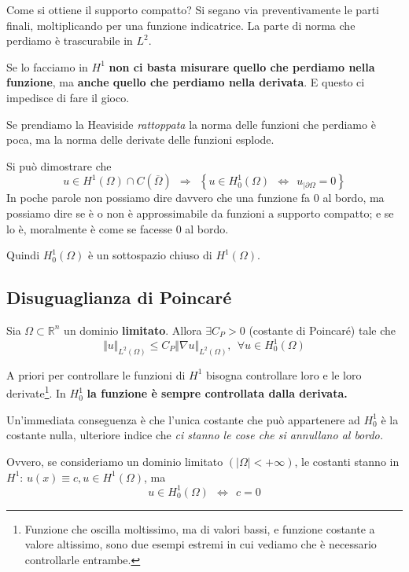 Come si ottiene il supporto compatto? Si segano via preventivamente le parti finali, moltiplicando per una funzione indicatrice. La parte di norma che perdiamo è trascurabile in $L^{2}$.

Se lo facciamo in $H^{1}$ \textbf{non ci basta misurare quello che perdiamo nella funzione}, ma \textbf{anche quello che perdiamo nella derivata}. E questo ci impedisce di fare il gioco.

Se prendiamo la Heaviside \textit{rattoppata} la norma delle funzioni che perdiamo è poca, ma la norma delle derivate delle funzioni esplode.

Si può dimostrare che
\begin{equation*}
    u\in H^{1}(\Omega) \cap C(\overline{\Omega }) \ \ \Rightarrow \ \ \left\{u\in H^{1}_{0}(\Omega) \ \ \Leftrightarrow \ \ u_{|\partial \Omega } =0\right\}
\end{equation*}
In poche parole non possiamo dire davvero che una funzione fa $0$ al bordo, ma possiamo dire se è o non è approssimabile da funzioni a supporto compatto; e se lo è, moralmente è come se facesse $0$ al bordo.

Quindi $H^{1}_{0}(\Omega)$ è un sottospazio chiuso di $H^{1}(\Omega)$.

\subsection{Disuguaglianza di Poincaré}
\begin{theorem}
     Sia $\Omega \subset \mathbb{R}^{n}$ un dominio \textbf{limitato}. Allora $\exists C_{P}  >0$ (costante di Poincaré) tale che
    \begin{equation}
        \Vert u\Vert _{L^{2}(\Omega)} \leqslant C_{P}\Vert \nabla u\Vert _{L^{2}(\Omega)} ,\ \ \forall u\in H^{1}_{0}(\Omega)
    \end{equation}
\end{theorem}
A priori per controllare le funzioni di $H^{1}$ bisogna controllare loro e le loro derivate\footnote{Funzione che oscilla moltissimo, ma di valori bassi, e funzione costante a valore altissimo, sono due esempi estremi in cui vediamo che è necessario controllarle entrambe.}. In $H^{1}_{0}$ \textbf{la funzione è sempre controllata dalla derivata.}
\begin{oss}
    Un'immediata conseguenza è che l'unica costante che può appartenere ad $H^{1}_{0}$ è la costante nulla, ulteriore indice che \textit{ci stanno le cose che si annullano al bordo.}

    Ovvero, se consideriamo un dominio limitato $(|\Omega |< +\infty)$, le costanti stanno in $H^{1} $: $u(x) \equiv c,u\in H^{1}(\Omega)$,  ma
    \begin{equation*}
        u\in H_{0}^{1}(\Omega) \ \ \Leftrightarrow \ \ c=0
    \end{equation*}
\end{oss}

